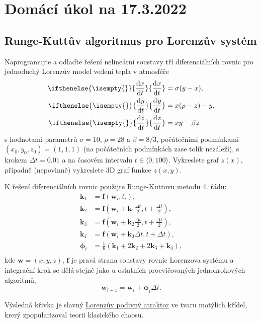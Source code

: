 \documentclass[a4paper,11pt,twoside]{article}
\def\vector#1{\boldsymbol{#1}}								%
\renewcommand{\d}{\mathrm{d}}
\newcommand{\derivative}[3][]{\ifthenelse{\isempty{#1}}	    %
	{\frac{\d{#2}}{\d{#3}}}
	{\frac{\d^{#1}{#2}}{\d{#3}^{#1}}}
}
\begin{document}
\section*{Domácí úkol na 17.3.2022}
\subsection*{Runge-Kuttův algoritmus pro Lorenzův systém}
Naprogramujte a odlaďte řešení nelineární soustavy tří diferenciálních rovnic pro jednoduchý Lorenzův model vedení tepla v atmosféře
\begin{align}
    \derivative{x}{t}&=\sigma(y-x),\nonumber\\
    \derivative{y}{t}&=x(\rho-z)-y,\nonumber\\
    \derivative{z}{t}&=xy-\beta z\nonumber
\end{align}
s hodnotami parametrů $\sigma=10$, $\rho=28$ a $\beta=8/3$, počátečními podmínkami $(x_0, y_0, z_0)=(1,1,1)$ (na počátečních podmínkách zase tolik nezáleží), s krokem $\Delta t=0.01$ a na časovém intervalu $t\in\langle0,100\rangle$.
Vykreslete graf $z(x)$, případně (nepovinně) vykreslete 3D graf funkce $z(x,y)$.

K řešení diferenciálních rovnic použijte Runge-Kuttovu metodu 4. řádu:
\begin{align*}
    \vector{k}_{1}&=\vector{f}(\vector{w}_{i},t_{i}),\\
    \vector{k}_{2}&=\vector{f}\left(\vector{w}_{i}+\vector{k}_{1}\frac{\Delta t}{2},t+\frac{\Delta t}{2}\right),\\
    \vector{k}_{3}&=\vector{f}\left(\vector{w}_{i}+\vector{k}_{2}\frac{\Delta t}{2},t+\frac{\Delta t}{2}\right),\\
    \vector{k}_{4}&=\vector{f}\left(\vector{w}_{i}+\vector{k}_{3}\Delta t,t+\Delta t\right),\\
    \vector{\phi}_{i}&=\frac{1}{6}\left(\vector{k}_{1}+2\vector{k}_{2}+2\vector{k}_{3}+\vector{k}_{4}\right),\\
\end{align*}
kde $\vector{w}=(x,y,z)$, $\vector{f}$ je pravá strana soustavy rovnic Lorenzova systému a integrační krok se dělá stejně jako u ostatních procvičovaných jednokrokových algoritmů,
\begin{equation*}
    \vector{w}_{i+1}=\vector{w}_{i}+\vector{\phi}_{i}\Delta t.
\end{equation*}

Výsledná křivka je slavný \href{https://cs.wikipedia.org/wiki/Lorenz%C5%AFv_atraktor}{Lorenzův podivný atraktor} ve tvaru motýlích křídel, krerý zpopularizoval teorii klasického chaosu.
\end{document}
